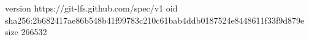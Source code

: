 version https://git-lfs.github.com/spec/v1
oid sha256:2b682417ae86b548b41f99783c210c61bab4ddb0187524e8448611f33f9d879e
size 266532
